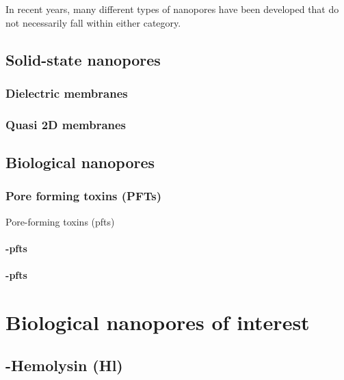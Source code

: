 In recent years, many different types of nanopores have been developed that do not necessarily fall within either category. 

\subsection{Solid-state nanopores}

\subsubsection{Dielectric membranes}

\subsubsection{Quasi 2D membranes}

\subsection{Biological nanopores}

\subsubsection{Pore forming toxins (PFTs)}

Pore-forming toxins (\glspl{pft})

\paragraph{\ta-\glspl{pft}}

\paragraph{\tb-\glspl{pft}}


%
%
\section{Biological nanopores of interest}


\subsection{\ta-Hemolysin (\ta Hl)}

